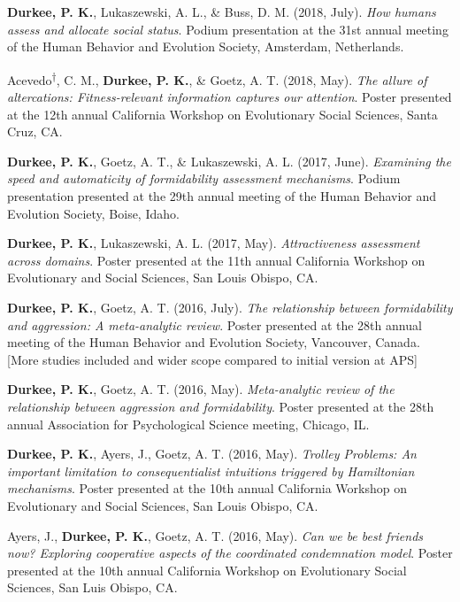 \documentclass[10.5pt,]{article}
\begin{document}
\hangindent=0.5in \textbf{Durkee, P. K.}, Lukaszewski, A. L., \& Buss,
D. M. (2018, July). \emph{How humans assess and allocate social status}.
Podium presentation at the 31st annual meeting of the Human Behavior and
Evolution Society, Amsterdam, Netherlands.

\hangindent=0.5in Acevedo\textsuperscript{†}, C. M., \textbf{Durkee, P.
K.}, \& Goetz, A. T. (2018, May). \emph{The allure of altercations:
Fitness-relevant information captures our attention}. Poster presented
at the 12th annual California Workshop on Evolutionary Social Sciences,
Santa Cruz, CA.

\hangindent=0.5in \textbf{Durkee, P. K.}, Goetz, A. T., \& Lukaszewski,
A. L. (2017, June). \emph{Examining the speed and automaticity of
formidability assessment mechanisms}. Podium presentation presented at
the 29th annual meeting of the Human Behavior and Evolution Society,
Boise, Idaho.

\hangindent=0.5in \textbf{Durkee, P. K.}, Lukaszewski, A. L. (2017,
May). \emph{Attractiveness assessment across domains}. Poster presented
at the 11th annual California Workshop on Evolutionary and Social
Sciences, San Louis Obispo, CA.

\hangindent=0.5in \textbf{Durkee, P. K.}, Goetz, A. T. (2016, July).
\emph{The relationship between formidability and aggression: A
meta-analytic review}. Poster presented at the 28th annual meeting of
the Human Behavior and Evolution Society, Vancouver, Canada. {[}More
studies included and wider scope compared to initial version at APS{]}

\hangindent=0.5in \textbf{Durkee, P. K.}, Goetz, A. T. (2016, May).
\emph{Meta-analytic review of the relationship between aggression and
formidability}. Poster presented at the 28th annual Association for
Psychological Science meeting, Chicago, IL.

\hangindent=0.5in \textbf{Durkee, P. K.}, Ayers, J., Goetz, A. T. (2016,
May). \emph{Trolley Problems: An important limitation to
consequentialist intuitions triggered by Hamiltonian mechanisms}. Poster
presented at the 10th annual California Workshop on Evolutionary and
Social Sciences, San Louis Obispo, CA.

\hangindent=0.5in Ayers, J., \textbf{Durkee, P. K.}, Goetz, A. T. (2016,
May). \emph{Can we be best friends now? Exploring cooperative aspects of
the coordinated condemnation model}. Poster presented at the 10th annual
California Workshop on Evolutionary Social Sciences, San Luis Obispo,
CA.
\end{document}
